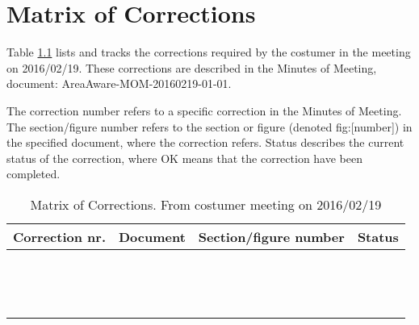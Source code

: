 \chapter{Matrix of Corrections}
\label{chp:matrix}

Table \ref{tb:MoC} lists and tracks the corrections required by the costumer in the meeting on 2016/02/19. These corrections are described in the Minutes of Meeting, document: AreaAware-MOM-20160219-01-01.

The correction number refers to a specific correction in the Minutes of Meeting. The section/figure number refers to the section or figure (denoted fig:[number]) in the specified document, where the correction refers. Status describes the current status of the correction, where OK means that the correction have been completed.\\

\begin{table}[ht]
\centering
\begin{tabular}{|c|c|>{\centering\arraybackslash}p{3cm}|>{\centering\arraybackslash}p{4cm}|}
\hline \textbf{Correction nr.} & \textbf{Document} & \textbf{Section/figure number} & \textbf{Status} \\ 
\hline  &  &  & \\ 
\hline  &  &  & \\ 
\hline  &  &  & \\ 
\hline  &  &  & \\ 
\hline  &  &  & \\ 
\hline  &  &  & \\ 
\hline  &  &  & \\ 
\hline  &  &  & \\ 
\hline  &  &  & \\ 
\hline  &  &  & \\ 
\hline  &  &  & \\ 
\hline  &  &  & \\ 
\hline  &  &  & \\ 
\hline  &  &  & \\ 
\hline 
\end{tabular}
\caption{Matrix of Corrections. From costumer meeting on 2016/02/19}
\label{tb:MoC} 
\end{table}